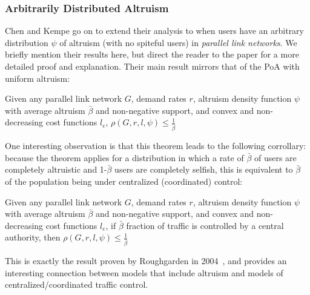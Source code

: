 \subsubsection{Arbitrarily Distributed Altruism}
Chen and Kempe go on to extend their analysis to when users have an arbitrary distribution $\psi$ of altruism (with no spiteful users) in \emph{parallel link networks}. We briefly mention their results here, but direct the reader to the paper for a more detailed proof and explanation. 
Their main result mirrors that of the PoA with uniform altruism:
\begin{theorem}
Given any parallel link network $G$, demand rates $r$, altruism density function $\psi$ with average altruism $\bar{\beta}$ and non-negative support, and convex and non-decreasing cost functions $l_e$,
   $\rho(G,r,l,\psi) \le \frac{1}{\bar{\beta}}$
\end{theorem}
One interesting observation is that this theorem leads to the following corrollary: because the theorem applies for a distribution in which a rate of $\bar{\beta}$ of users are completely altruistic and 1-$\bar{\beta}$ users are completely selfish, this is equivalent to $\bar{\beta}$ of the population being under centralized (coordinated) control:
\begin{corollary}
Given any parallel link network $G$, demand rates $r$, altruism density function $\psi$ with average altruism $\bar{\beta}$ and non-negative support, and convex and non-decreasing cost functions $l_e$,
if $\bar{\beta}$ fraction of traffic is controlled by a central authority, then
   $\rho(G,r,l,\psi) \le \frac{1}{\bar{\beta}}$
\end{corollary}
This is exactly the result proven by Roughgarden in 2004~\cite{roughgarden04}, and provides an interesting connection between models that include altruism and models of centralized/coordinated traffic control.
